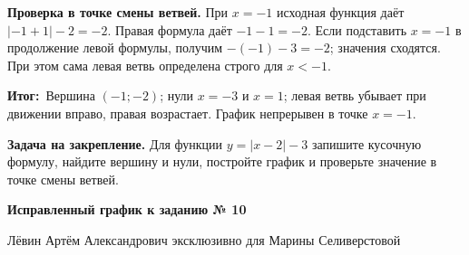 \documentclass[12pt,a4paper]{article}
\newcommand{\outcome}{\textcolor{teal!60!black}{\textbf{Итог:}}}
\begin{document}
\textbf{Проверка в точке смены ветвей.} При $x=-1$ исходная функция даёт $|-1+1|-2=-2$. Правая формула даёт $-1-1=-2$. Если подставить $x=-1$ в продолжение левой формулы, получим $-(-1)-3=-2$; значения сходятся. При этом сама левая ветвь определена строго для $x<-1$.

\outcome\ Вершина $(-1;-2)$; нули $x=-3$ и $x=1$; левая ветвь убывает при движении вправо, правая возрастает. График непрерывен в точке $x=-1$.

\textbf{Задача на закрепление.} Для функции $y=|x-2|-3$ запишите кусочную формулу, найдите вершину и нули, постройте график и проверьте значение в точке смены ветвей.

\clearpage
\begin{center}
\large\bfseries Исправленный график к заданию № 10
\end{center}
\vspace{1cm}
\begin{center}
\end{center}
\vfill
\begin{center}
Лёвин Артём Александрович эксклюзивно для Марины Селиверстовой
\end{center}
\end{document}
